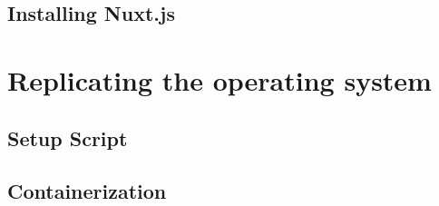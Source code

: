         \subsection{Installing Nuxt.js}

    \section{Replicating the operating system}
        \subsection{Setup Script}
        \subsection{Containerization}
